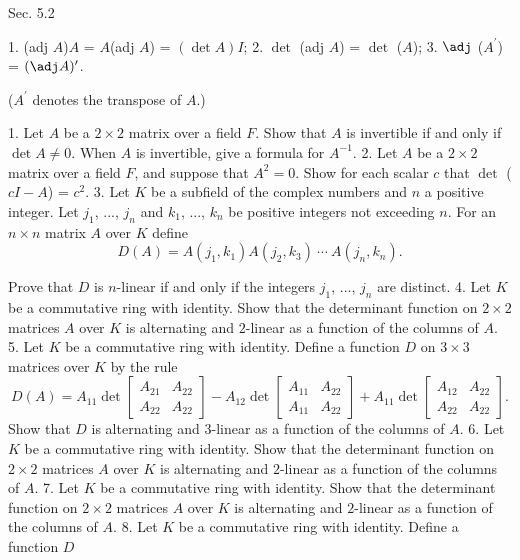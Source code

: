 Sec. 5.2

1. (adj \(A\))\(A\) = \(A\)(adj \(A\)) = \((\det A)I\);
2. \(\det\) (adj \(A\)) = \(\det\) (\(A\));
3. \(\adj\) (\(A^{\prime}\)) = \((\adj A)^{\prime}\).

(\(A^{\prime}\) denotes the transpose of \(A\).)

1. Let \(A\) be a \(2\times 2\) matrix over a field \(F\). Show that \(A\) is invertible if and only if \(\det A\neq 0\). When \(A\) is invertible, give a formula for \(A^{-1}\).
2. Let \(A\) be a \(2\times 2\) matrix over a field \(F\), and suppose that \(A^{2}=0\). Show for each scalar \(c\) that \(\det\) (\(cI-A\)) = \(c^{2}\).
3. Let \(K\) be a subfield of the complex numbers and \(n\) a positive integer. Let \(j_{1}\), ..., \(j_{n}\) and \(k_{1}\), ..., \(k_{n}\) be positive integers not exceeding \(n\). For an \(n\times n\) matrix \(A\) over \(K\) define \[D(A)=A(j_{1},k_{1})A(j_{2},k_{3})\ \cdots\ A(j_{n},k_{n}).\]

Prove that \(D\) is \(n\)-linear if and only if the integers \(j_{1}\), ..., \(j_{n}\) are distinct.
4. Let \(K\) be a commutative ring with identity. Show that the determinant function on \(2\times 2\) matrices \(A\) over \(K\) is alternating and \(2\)-linear as a function of the columns of \(A\).
5. Let \(K\) be a commutative ring with identity. Define a function \(D\) on \(3\times 3\) matrices over \(K\) by the rule \[D(A)=A_{11}\det\begin{bmatrix}A_{21}&A_{22}\\ A_{22}&A_{22}\end{bmatrix}-A_{12}\det\begin{bmatrix}A_{11}&A_{22}\\ A_{11}&A_{22}\end{bmatrix}+A_{11}\det\begin{bmatrix}A_{12}&A_{22}\\ A_{22}&A_{22}\end{bmatrix}.\] Show that \(D\) is alternating and \(3\)-linear as a function of the columns of \(A\).
6. Let \(K\) be a commutative ring with identity. Show that the determinant function on \(2\times 2\) matrices \(A\) over \(K\) is alternating and \(2\)-linear as a function of the columns of \(A\).
7. Let \(K\) be a commutative ring with identity. Show that the determinant function on \(2\times 2\) matrices \(A\) over \(K\) is alternating and \(2\)-linear as a function of the columns of \(A\).
8. Let \(K\) be a commutative ring with identity. Define a function \(D\) 